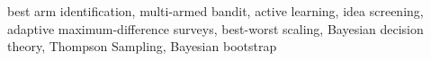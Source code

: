 \documentclass[blindrev,mnsc]{informs3}
\begin{document}
\KEYWORDS
{best arm identification, multi-armed bandit, active learning, idea screening, adaptive maximum-difference surveys, best-worst scaling, Bayesian decision theory, Thompson Sampling, Bayesian bootstrap}




\maketitle



\end{document}
